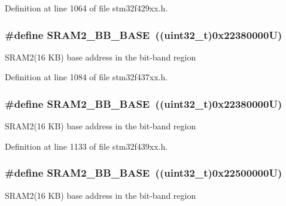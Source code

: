 Definition at line 1064 of file stm32f429xx.\+h.

\subsubsection[{\texorpdfstring{S\+R\+A\+M2\+\_\+\+B\+B\+\_\+\+B\+A\+SE}{SRAM2_BB_BASE}}]{\setlength{\rightskip}{0pt plus 5cm}\#define S\+R\+A\+M2\+\_\+\+B\+B\+\_\+\+B\+A\+SE~((uint32\+\_\+t)0x22380000\+U)}\hypertarget{group___peripheral__memory__map_gac33cb6edadf184ab9860d77089503922}{}\label{group___peripheral__memory__map_gac33cb6edadf184ab9860d77089503922}
S\+R\+A\+M2(16 K\+B) base address in the bit-\/band region 

Definition at line 1084 of file stm32f437xx.\+h.

\subsubsection[{\texorpdfstring{S\+R\+A\+M2\+\_\+\+B\+B\+\_\+\+B\+A\+SE}{SRAM2_BB_BASE}}]{\setlength{\rightskip}{0pt plus 5cm}\#define S\+R\+A\+M2\+\_\+\+B\+B\+\_\+\+B\+A\+SE~((uint32\+\_\+t)0x22380000\+U)}\hypertarget{group___peripheral__memory__map_gac33cb6edadf184ab9860d77089503922}{}\label{group___peripheral__memory__map_gac33cb6edadf184ab9860d77089503922}
S\+R\+A\+M2(16 K\+B) base address in the bit-\/band region 

Definition at line 1133 of file stm32f439xx.\+h.

\subsubsection[{\texorpdfstring{S\+R\+A\+M2\+\_\+\+B\+B\+\_\+\+B\+A\+SE}{SRAM2_BB_BASE}}]{\setlength{\rightskip}{0pt plus 5cm}\#define S\+R\+A\+M2\+\_\+\+B\+B\+\_\+\+B\+A\+SE~((uint32\+\_\+t)0x22500000\+U)}\hypertarget{group___peripheral__memory__map_gac33cb6edadf184ab9860d77089503922}{}\label{group___peripheral__memory__map_gac33cb6edadf184ab9860d77089503922}
S\+R\+A\+M2(16 K\+B) base address in the bit-\/band region 

